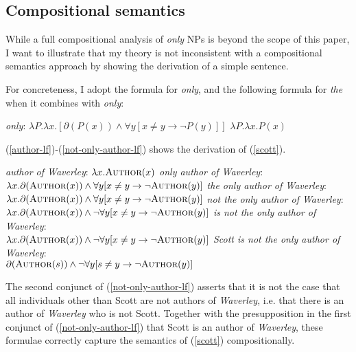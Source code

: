 \subsection{Compositional semantics}
While a full compositional analysis of \textit{only} NPs is beyond the scope of this paper, I want to illustrate that my theory is not inconsistent with a compositional semantics approach by showing the derivation of a simple sentence.

For concreteness, I adopt the  formula for \textit{only}, and the following formula for \textit{the} when it combines with \textit{only}:

\begin{exe}
	  \textit{only}: $ \lambda P . \lambda x . [ \partial(P(x)) \land \forall y [ x \ne y \to \neg P(y) ] ] $
	\ex $\lambda P . \lambda x . P(x)$
\end{exe}

(\ref{author-lf})-(\ref{not-only-author-lf}) shows the derivation of (\ref{scott}).

\begin{exe}
	\ex \label{author-lf} \textit{author of Waverley}: $\lambda x . \textsc{Author}(x)$
	\ex \textit{only author of Waverley}: $\lambda x . \partial(\textsc{Author}(x)) \land \forall y [ x \ne y \to \neg \textsc{Author}(y) ]$
	\ex \textit{the only author of Waverley}: $\lambda x . \partial(\textsc{Author}(x)) \land \forall y [ x \ne y \to \neg \textsc{Author}(y) ]$
	\ex \textit{not the only author of Waverley}: \\ $\lambda x . \partial(\textsc{Author}(x)) \land \neg  \forall y [ x \ne y \to \neg \textsc{Author}(y) ]$
	\ex \textit{is not the only author of Waverley}: \\ $\lambda x . \partial(\textsc{Author}(x)) \land \neg  \forall y [ x \ne y \to \neg \textsc{Author}(y) ]$
	\ex \label{not-only-author-lf} \textit{Scott is not the only author of Waverley}: \\ $\partial(\textsc{Author}(s)) \land \neg \forall y [ s \ne y \to \neg \textsc{Author}(y) ]$
\end{exe}

The second conjunct of (\ref{not-only-author-lf}) asserts that it is not the case that all individuals other than Scott are not authors of \textit{Waverley}, i.e. that there is an author of \textit{Waverley} who is not Scott. Together with the presupposition in the first conjunct of (\ref{not-only-author-lf}) that Scott is an author of \textit{Waverley}, these formulae correctly capture the semantics of (\ref{scott}) compositionally.